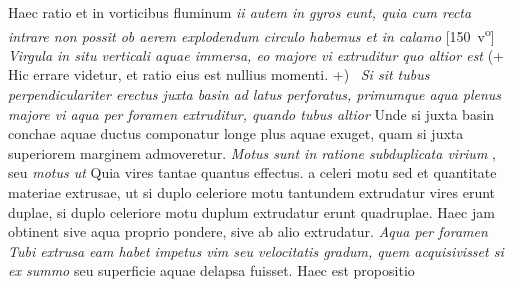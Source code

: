 Haec ratio et in vorticibus fluminum
\textit{ii autem in gyros eunt, quia cum recta intrare non possit ob aerem explodendum circulo  habemus et in calamo }
[150~v\textsuperscript{o}]
\pend %
\pstart%
%
%
%
% 
 \,
\textit{Virgula\protect{} in situ verticali aquae immersa, eo majore vi extruditur quo altior est } (+ Hic errare videtur, et ratio eius est nullius momenti. +)
 \,
\textit{Si sit tubus perpendiculariter erectus juxta basin ad latus perforatus, primumque aqua plenus majore vi aqua per foramen extruditur, quando tubus altior } Unde si juxta basin conchae aquae ductus componatur longe plus aquae exuget, quam si juxta superiorem marginem admoveretur. \textit{Motus sunt in ratione subduplicata\protect{} virium} , seu 
\textit{motus ut}
Quia vires tantae quantus effectus.
 a celeri motu sed et quantitate materiae extrusae, ut si duplo celeriore motu tantundem extrudatur vires erunt duplae, si duplo celeriore motu duplum extrudatur erunt quadruplae. Haec jam obtinent sive aqua proprio pondere, sive ab alio extrudatur.
\pend
\pstart
\textit{Aqua per foramen Tubi extrusa eam habet impetus\protect{} vim seu velocitatis\protect{} gradum, quem acquisivisset si ex summo
} seu superficie aquae delapsa fuisset. Haec est propositio
